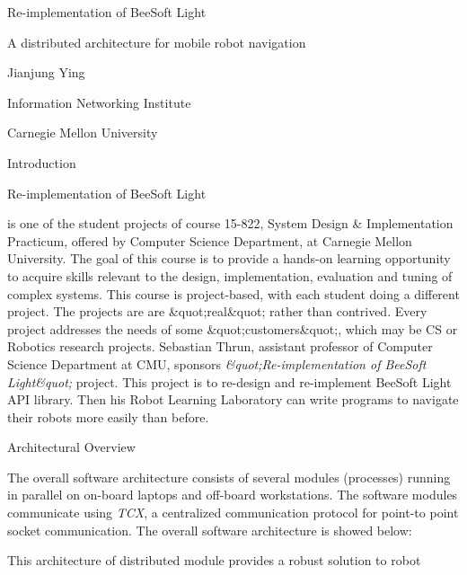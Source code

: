 
{\bf \par Re-implementation of BeeSoft Light}A distributed
architecture for mobile robot navigation\par \par Jianjung Ying\par
\par Information Networking Institute\par \par Carnegie Mellon
University\par \par \par \par Introduction\par {\it \par
  Re-implementation of BeeSoft Light} is one of the student projects
of course 15-822, System Design \& Implementation Practicum, offered
by Computer Science Department, at Carnegie Mellon University. The
goal of this course is to provide a hands-on learning opportunity to
acquire skills relevant to the design, implementation, evaluation and
tuning of complex systems. This course is project-based, with each
student doing a different project. The projects are are
\&quot;real\&quot; rather than contrived. Every project addresses the
needs of some \&quot;customers\&quot;, which may be CS or Robotics
research projects. Sebastian Thrun, assistant professor of Computer
Science Department at CMU, sponsors {\it \&quot;Re-implementation of
  BeeSoft Light\&quot;} project. This project is to re-design and
re-implement BeeSoft Light API library. Then his Robot Learning
Laboratory can write programs to navigate their robots more easily
than before.\par \par Architectural Overview \par \par The overall
software architecture consists of several modules (processes) running
in parallel on on-board laptops and off-board workstations. The
software modules communicate using {\it TCX}, a centralized
communication protocol for point-to point socket communication. The
overall software architecture is showed below:\par \par \par \par This
architecture of distributed module provides a robust solution to robot
